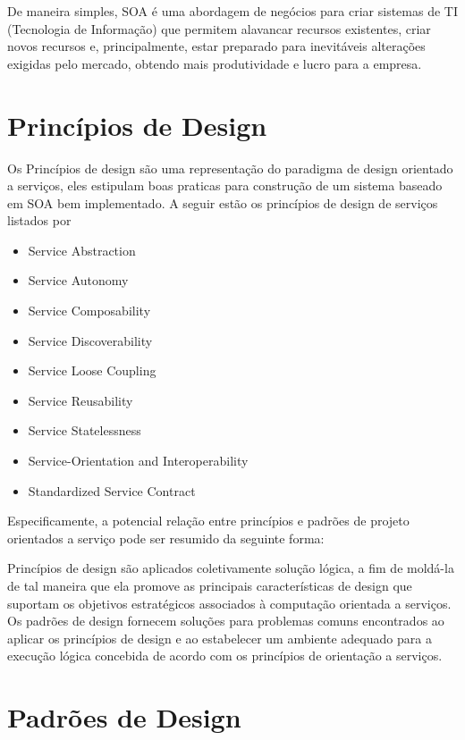\documentclass[12pt]{article}
\begin{document}
De maneira simples, SOA é uma abordagem de negócios para criar sistemas de TI (Tecnologia de Informação) que permitem alavancar recursos existentes, criar novos recursos e, principalmente, estar preparado para inevitáveis alterações exigidas pelo mercado, obtendo mais produtividade e lucro para a empresa.


\section{Princípios de Design} 

Os Princípios de design são uma representação do paradigma de design orientado a serviços, eles estipulam boas praticas para construção de um sistema baseado em SOA bem implementado. A seguir estão os princípios de design de serviços listados por %

\begin{itemize}
\item Service Abstraction
\item Service Autonomy
\item Service Composability 
\item Service Discoverability
\item Service Loose Coupling
\item Service Reusability
\item Service Statelessness
\item Service-Orientation and Interoperability
\item Standardized Service Contract
\end{itemize}

Especificamente, a potencial relação entre princípios e padrões de projeto orientados a serviço pode ser resumido da seguinte forma:

    Princípios de design são aplicados coletivamente solução lógica, a fim de moldá-la de tal maneira que ela promove as principais características de design que suportam os objetivos estratégicos associados à computação orientada a serviços.
   Os padrões de design fornecem soluções para problemas comuns encontrados ao aplicar os princípios de design e ao estabelecer um ambiente adequado para a execução lógica concebida de acordo com os princípios de orientação a serviços.

\section{Padrões de Design}
\end{document}
